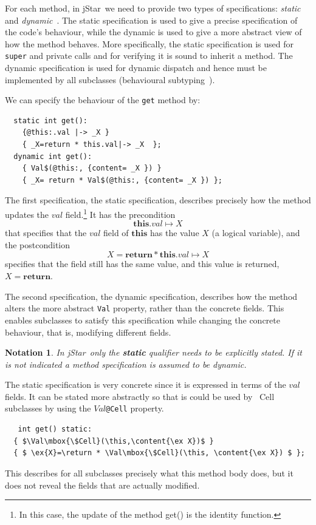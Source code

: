 \documentclass[11pt]{article}
\newcommand{\jStar}{{\sf jStar}}
\newcommand{\Val}{\mathit{Val}}
\newcommand{\ex}[1]{\mathord{\hat{#1}}}
\newcommand{\content}[1]{\{\text{content=} \, #1 \}}
\newcommand{\this}{\mathbf{this}}
\newcommand{\return}{\mathbf{return}}
\newtheorem{notation}{Notation}
\def\J{\lstinline}
\newcommand{\JS}[1]{$\mathit{#1}$}
\begin{document}
For each method, in \jStar \ we need to provide two types of specifications: {\em static}
and {\em dynamic}~\cite{PB08,chin08}.  The static specification is
used to give a precise specification of the code's behaviour, while the
dynamic is used to give a more abstract view of how the method
behaves.  More specifically, the static specification is used for
\J~super~ and private calls and for verifying it is sound to inherit a
method.  The dynamic specification is used for dynamic dispatch
and hence must be implemented by all subclasses (behavioural
subtyping~\cite{liskov94}).

We can  specify the behaviour of the \J~get~ method by:
\begin{verbatim}
  static int get():
    {@this:.val |-> _X }
    { _X=return * this.val|-> _X  };
  dynamic int get():
    { Val$(@this:, {content= _X }) } 
    { _X= return * Val$(@this:, {content= _X }) };
\end{verbatim}
%
The first specification, the static specification, describes precisely
how the method updates the \JS{val} field.\footnote{In this case, the
  update of the method get() is the identity function.}  It has the
precondition $$\this.val \mapsto X$$ that specifies that the \JS{val}
field of $\this$ has the value \JS{X} (a logical
variable), and
the postcondition $$X=\return * \this.val \mapsto X$$ specifies that the
field still has the same value, and this value is returned,
$X=\return$.

The second specification, the dynamic specification, describes how the
method alters the more abstract \J~Val~ property, rather than the
concrete fields.  This enables subclasses to satisfy this
specification while changing the concrete behaviour, that is,
modifying different fields.

\begin{notation}
In \jStar \ only the {\bf static}
  qualifier needs to be explicitly stated. If it is not indicated 
  a method specification is assumed to be dynamic.
  \end{notation}


The static specification is very concrete since it is expressed in terms of the 
$val$ fields.  It can be stated more abstractly so that is could be used by \JS~Cell~ 
subclasses  by using the \JS{Val}\J~@Cell~ property.
\begin{lstlisting}
   int get() static: 
  { $\Val\mbox{\$Cell}(\this,\content{\ex X})$ }
  { $ \ex{X}=\return * \Val\mbox{\$Cell}(\this, \content{\ex X}) $ };
\end{lstlisting}
This describes for all subclasses precisely what this method body
does, but it does not reveal the fields that are actually modified.
\end{document}

